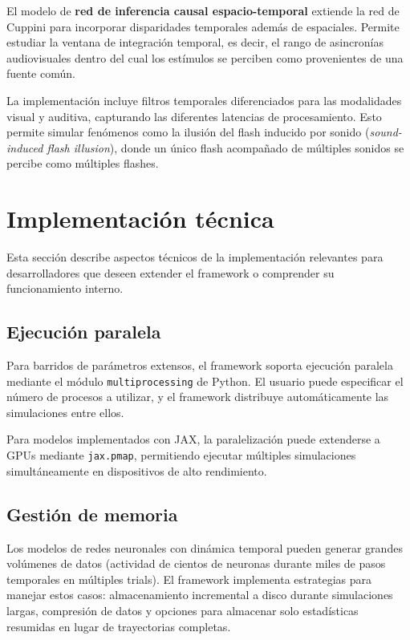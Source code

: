 \medskip
El modelo de \textbf{red de inferencia causal espacio-temporal} extiende la red de Cuppini para incorporar disparidades temporales además de espaciales. Permite estudiar la ventana de integración temporal, es decir, el rango de asincronías audiovisuales dentro del cual los estímulos se perciben como provenientes de una fuente común.

La implementación incluye filtros temporales diferenciados para las modalidades visual y auditiva, capturando las diferentes latencias de procesamiento. Esto permite simular fenómenos como la ilusión del flash inducido por sonido (\textit{sound-induced flash illusion}), donde un único flash acompañado de múltiples sonidos se percibe como múltiples flashes.


\section{Implementación técnica}
\label{sec:snmsi_implementacion}

Esta sección describe aspectos técnicos de la implementación relevantes para desarrolladores que deseen extender el framework o comprender su funcionamiento interno.

\subsection{Ejecución paralela}
\label{subsec:snmsi_paralelo}

Para barridos de parámetros extensos, el framework soporta ejecución paralela mediante el módulo \texttt{multiprocessing} de Python. El usuario puede especificar el número de procesos a utilizar, y el framework distribuye automáticamente las simulaciones entre ellos.

Para modelos implementados con JAX, la paralelización puede extenderse a GPUs mediante \texttt{jax.pmap}, permitiendo ejecutar múltiples simulaciones simultáneamente en dispositivos de alto rendimiento.

\subsection{Gestión de memoria}
\label{subsec:snmsi_memoria}

Los modelos de redes neuronales con dinámica temporal pueden generar grandes volúmenes de datos (actividad de cientos de neuronas durante miles de pasos temporales en múltiples trials). El framework implementa estrategias para manejar estos casos: almacenamiento incremental a disco durante simulaciones largas, compresión de datos y opciones para almacenar solo estadísticas resumidas en lugar de trayectorias completas.

